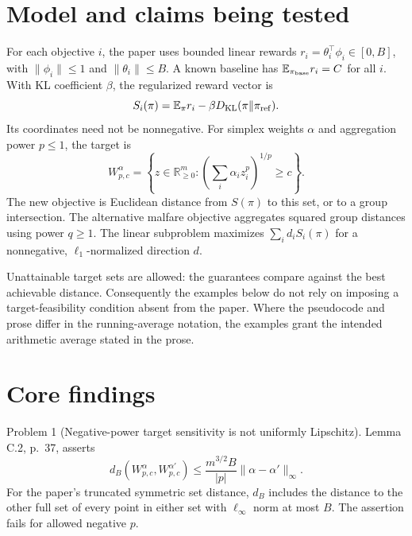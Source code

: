 \documentclass[10pt]{article}
\begin{document}
\section*{Model and claims being tested}
For each objective \(i\), the paper uses bounded linear rewards \(r_i=\theta_i^\top\phi_i\in[0,B]\), with \(\|\phi_i\|\le1\) and \(\|\theta_i\|\le B\). A known baseline has \(\mathbb E_{\pi_{\rm base}}r_i=C\) for all \(i\). With KL coefficient \(\beta\), the regularized reward vector is \[S_i(\pi)=\mathbb E_\pi r_i-\beta D_{\rm KL}(\pi\|\pi_{\rm ref}).\] Its coordinates need not be nonnegative. For simplex weights \(\alpha\) and aggregation power \(p\le1\), the target is \[W_{p,c}^{\alpha}
 =\left\{z\in\mathbb R_{\ge0}^m:
       \left(\sum_i\alpha_i z_i^p\right)^{1/p}\ge c\right\}.\] The new objective is Euclidean distance from \(S(\pi)\) to this set, or to a group intersection. The alternative malfare objective aggregates squared group distances using power \(q\ge1\). The linear subproblem maximizes \(\sum_i d_i S_i(\pi)\) for a nonnegative, \(\ell_1\)-normalized direction \(d\).\par
Unattainable target sets are allowed: the guarantees compare against the best achievable distance. Consequently the examples below do not rely on imposing a target-feasibility condition absent from the paper. Where the pseudocode and prose differ in the running-average notation, the examples grant the intended arithmetic average stated in the prose.\par
\section*{Core findings}
Problem 1 (Negative-power target sensitivity is not uniformly Lipschitz).  Lemma C.2, p. 37, asserts \[d_B(W^\alpha_{p,c},W^{\alpha'}_{p,c})
 \le \frac{m^{3/2}B}{|p|}\|\alpha-\alpha'\|_\infty .\] For the paper’s truncated symmetric set distance, \(d_B\) includes the distance to the other full set of every point in either set with \(\ell_\infty\) norm at most \(B\). The assertion fails for allowed negative \(p\).\par
\end{document}

